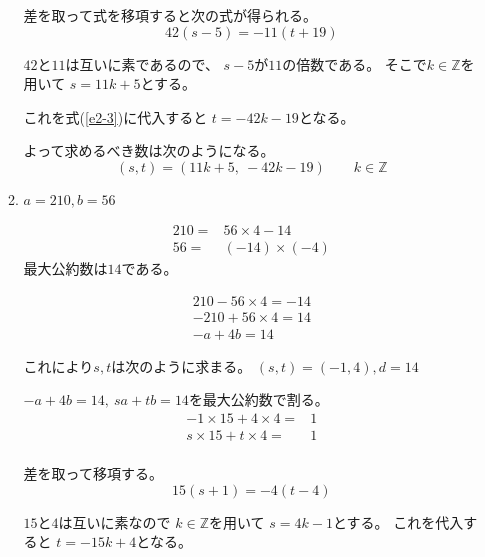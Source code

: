 \documentclass[12pt,b5paper]{ltjsarticle}
\begin{document}
\begin{enumerate}
\begin{enumerate}
            差を取って式を移項すると次の式が得られる。
            \begin{equation}
             42(s-5) = -11(t+19)\label{e2-3}
            \end{equation}

            $42$と$11$は互いに素であるので、
            $s-5$が$11$の倍数である。
            そこで$k\in\mathbb{Z}$を用いて
            $s=11k+5$とする。

            これを式(\ref{e2-3})に代入すると
            $t= -42k -19$となる。

            よって求めるべき数は次のようになる。
            \begin{equation}
             (s,t) = (11k+5,\ -42k-19) \qquad k\in\mathbb{Z}
            \end{equation}



            \hrulefill

       \item
            $a=210,b=56$

            \dotfill

            \begin{align}
             210 =& 56 \times 4 -14\\
             56 =& (-14)\times (-4)
            \end{align}
            最大公約数は$14$である。

            \begin{align}
             210 - 56 \times 4 = -14\\
             -210 + 56 \times 4 = 14\\
             -a+4b=14
            \end{align}

            これにより$s,t$は次のように求まる。
            $(s,t)=(-1,4),d=14$


            $-a+4b=14,\ sa+tb=14$を最大公約数で割る。
            \begin{align}
             -1\times 15 +4\times 4 =& 1\\
             s\times 15 +t\times 4 =& 1\\
            \end{align}

            差を取って移項する。
            \begin{equation}
             15(s+1) = -4(t-4)
            \end{equation}

            $15$と$4$は互いに素なので
            $k\in\mathbb{Z}$を用いて
            $s=4k-1$とする。
            これを代入すると
            $t=-15k+4$となる。


\end{enumerate}
\end{enumerate}
\end{document}
